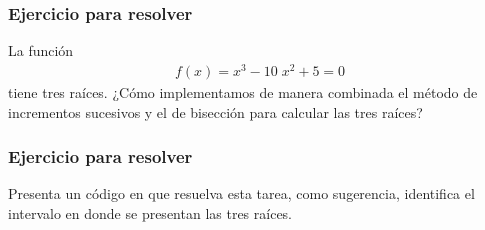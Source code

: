 \begin{frame}
\frametitle{Ejercicio para resolver}
La función
\begin{align*}
f(x) = x^{3} - 10 \; x^{2} + 5 = 0
\end{align*}
tiene tres raíces. ¿Cómo implementamos de manera combinada el método de incrementos sucesivos y el de bisección para calcular las tres raíces?
\end{frame}
\begin{frame}
\frametitle{Ejercicio para resolver}Presenta un código en \python{} que resuelva esta tarea, como sugerencia, identifica el intervalo en donde se presentan las tres raíces.
\end{frame}

